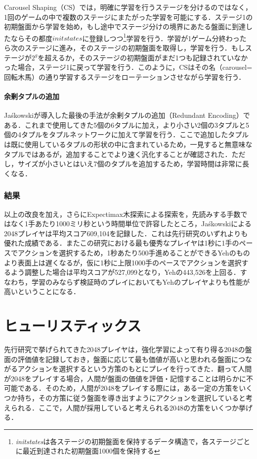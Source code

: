 \documentclass{suribt}
\begin{document}
Carousel Shaping（CS）では，明確に学習を行うステージを分けるのではなく，1回のゲームの中で複数のステージにまたがった学習を可能にする．ステージ1の初期盤面から学習を始め，もし途中でステージ分けの境界にあたる盤面に到達したならその都度$initstates$に登録しつつ\footnote{\textit{initstates}は各ステージの初期盤面を保持するデータ構造で，各ステージごとに最近到達された初期盤面1000個を保持する}学習を行う．学習が1ゲーム分終わったら次のステージに進み，そのステージの初期盤面を取得し，学習を行う．もしステージが$2^g$を超えるか，そのステージの初期盤面がまだ1つも記録されていなかった場合，ステージ1に戻って学習を行う．このように，CSはその名（carousel=回転木馬）の通り学習するステージをローテーションさせながら学習を行う．

\subsubsection{余剰タプルの追加}
Ja\'{s}kowskiが導入した最後の手法が余剰タプルの追加（Redundant Encoding）である．これまで使用してきた5個の6タプルに加え，より小さい2個の3タプルと5個の4タプルをタプルネットワークに加えて学習を行う．ここで追加したタプルは既に使用しているタプルの形状の中に含まれているため，一見すると無意味なタプルではあるが，追加することでより速く汎化することが確認された．ただし，サイズが小さいとはいえ7個のタプルを追加するため，学習時間は非常に長くなる．

\subsection{結果}
以上の改良を加え，さらにExpectimax木探索による探索を，先読みする手数ではなく1手あたり1000ミリ秒という時間単位で許容したところ，Ja\'{s}kowskiによる2048プレイヤは平均スコア609,104を記録した．これは先行研究のいずれよりも優れた成績である．またこの研究における最も優秀なプレイヤは1秒に1手のペースでアクションを選択するため，1秒あたり500手進めることができるYehのものより表面上は遅くなるが，仮に1秒に上限1000手のペースでアクションを選択するよう調整した場合は平均スコアが527,099となり，Yehの443,526を上回る．すなわち，学習のみならず検証時のプレイにおいてもYehのプレイヤよりも性能が高いということになる．

\chapter{ヒューリスティックス}
先行研究で挙げられてきた2048プレイヤは，強化学習によって有り得る2048の盤面の評価値を記録しておき，盤面に応じて最も価値が高いと思われる盤面につながるアクションを選択するという方策のもとにプレイを行ってきた．翻って人間が2048をプレイする場合，人間が盤面の価値を評価・記憶することは明らかに不可能である．そのため，人間が2048をプレイする際には，ある一定の方策をいくつか持ち，その方策に従う盤面を導き出すようにアクションを選択していると考えられる．ここで，人間が採用していると考えられる2048の方策をいくつか挙げる．
\end{document}
